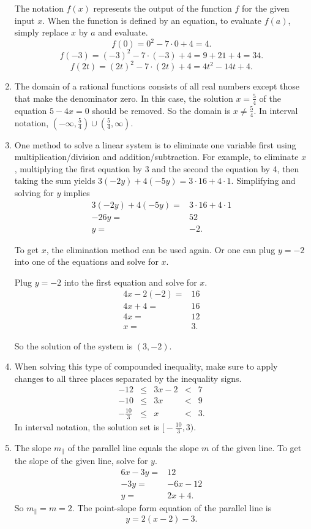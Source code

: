 \documentclass[
  12pt]{article}
\begin{document}
\begin{enumerate}
  The notation \(f(x)\) represents the output of the function \(f\) for
  the given input \(x\). When the function is defined by an equation, to
  evaluate \(f(a)\), simply replace \(x\) by \(a\) and evaluate.
  \[f(0)=0^2-7\cdot 0 +4=4.\]
  \[f(-3)=(-3)^2-7\cdot (-3) + 4=9+21+4=34.\]
  \[f(2t)=(2t)^2-7\cdot (2t) + 4=4t^2-14t+4.\]
\item
  The domain of a rational functions consists of all real numbers except
  those that make the denominator zero. In this case, the solution
  \(x=\frac54\) of the equation \(5-4x=0\) should be removed. So the
  domain is \(x\neq\frac54\). In interval notation,
  \((-\infty, \frac54)\cup(\frac54,\infty)\).
\item
  One method to solve a linear system is to eliminate one variable first
  using multiplication/division and addition/subtraction. For example,
  to eliminate \(x\), multiplying the first equation by 3 and the second
  the equation by 4, then taking the sum yields
  \(3(-2y)+4(-5y)=3\cdot 16+4\cdot 1\). Simplifying and solving for
  \(y\) implies \[
  \begin{aligned}
  3(-2y)+4(-5y)=&3\cdot 16+4\cdot 1\\
  -26y=&52\\
  y=&-2.
  \end{aligned}
  \]

  To get \(x\), the elimination method can be used again. Or one can
  plug \(y=-2\) into one of the equations and solve for \(x\).

  Plug \(y=-2\) into the first equation and solve for \(x\). \[
  \begin{aligned}
  4x-2(-2)=&16\\
  4x+4=&16\\
  4x=&12\\
  x=&3.
  \end{aligned}
  \]

  So the solution of the system is \((3, -2)\).
\item
  When solving this type of compounded inequality, make sure to apply
  changes to all three places separated by the inequality signs. \[
  \begin{array}{rcccl}
  -12 &\le& 3x-2 &<&7\\
  -10 &\le& 3x &<&9\\
  -\frac{10}{3}&\le& x &<&3.
  \end{array}
  \] In interval notation, the solution set is
  \(\big[-\frac{10}{3}, 3\big)\).
\item
  The slope \(m_{\parallel}\) of the parallel line equals the slope
  \(m\) of the given line. To get the slope of the given line, solve for
  \(y\). \[
  \begin{aligned}
  6x-3y=&12\\
  -3y=&-6x-12\\
  y=&2x+4.
  \end{aligned}
  \] So \(m_\parallel=m=2\). The point-slope form equation of the
  parallel line is \[y=2(x-2)-3.\]


\end{enumerate}
\end{document}
